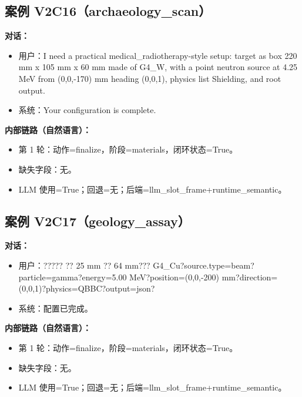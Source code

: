 \documentclass[11pt]{ctexart}
\begin{document}
\subsection{案例 V2C16（archaeology\_scan）}
\textbf{对话：}
\begin{itemize}
\item 用户：I need a practical medical\_radiotherapy-style setup: target as box 220 mm x 105 mm x 60 mm made of G4\_W, with a point neutron source at 4.25 MeV from (0,0,-170) mm heading (0,0,1), physics list Shielding, and root output.
\item 系统：Your configuration is complete.
\end{itemize}
\textbf{内部链路（自然语言）：}
\begin{itemize}
\item 第 1 轮：动作=finalize，阶段=materials，闭环状态=True。
\item 缺失字段：无。
\item LLM 使用=True；回退=无；后端=llm\_slot\_frame+runtime\_semantic。
\end{itemize}
\subsection{案例 V2C17（geology\_assay）}
\textbf{对话：}
\begin{itemize}
\item 用户：????? ?? 25 mm ?? 64 mm??? G4\_Cu?source.type=beam?particle=gamma?energy=5.00 MeV?position=(0,0,-200) mm?direction=(0,0,1)?physics=QBBC?output=json?
\item 系统：配置已完成。
\end{itemize}
\textbf{内部链路（自然语言）：}
\begin{itemize}
\item 第 1 轮：动作=finalize，阶段=materials，闭环状态=True。
\item 缺失字段：无。
\item LLM 使用=True；回退=无；后端=llm\_slot\_frame+runtime\_semantic。
\end{itemize}
\end{document}
